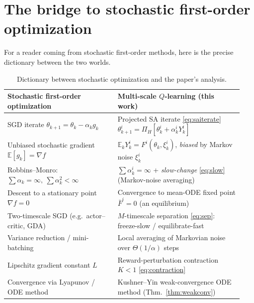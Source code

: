 \documentclass[11pt]{article}
\theoremstyle{plain}
\theoremstyle{definition}
\newcommand{\E}{\mathbb{E}}
\begin{document}
\section{The bridge to stochastic first-order optimization}
\label{sec:bridge}

For a reader coming from stochastic first-order methods, here is the precise
dictionary between the two worlds.

\begin{table}[h]
\centering
\renewcommand{\arraystretch}{1.25}
\begin{tabular}{@{}p{0.44\linewidth} p{0.5\linewidth}@{}}
\toprule
\textbf{Stochastic first-order optimization} & \textbf{Multi-scale $Q$-learning (this work)} \\
\midrule
SGD iterate $\theta_{k+1}=\theta_k-\alpha_k g_k$ &
  Projected SA iterate \eqref{eq:saiterate}
  $\theta^i_{k+1}=\Pi_H[\theta^i_k+\alpha^i_k Y^i_k]$ \\
Unbiased stochastic gradient $\E[g_k]=\nabla f$ &
  $\E_k Y^i_k=F^i(\theta_k,\xi^i_k)$, \emph{biased} by Markov noise $\xi^i_k$ \\
Robbins--Monro: $\sum\alpha_k=\infty,\ \sum\alpha_k^2<\infty$ &
  $\sum\alpha^i_k=\infty$ + \emph{slow-change} \eqref{eq:slow}
  (Markov-noise averaging) \\
Descent to a stationary point $\nabla f=0$ &
  Convergence to mean-ODE fixed point $\bar F^i=0$ (an equilibrium) \\
Two-timescale SGD (e.g.\ actor--critic, GDA) &
  $M$-timescale separation \eqref{eq:sep}: freeze-slow / equilibrate-fast \\
Variance reduction / mini-batching &
  Local averaging of Markovian noise over $\Theta(1/\alpha)$ steps \\
Lipschitz gradient constant $L$ &
  Reward-perturbation contraction $K<1$ \eqref{eq:contraction} \\
Convergence via Lyapunov / ODE method &
  Kushner--Yin weak-convergence ODE method (Thm.~\ref{thm:weakconv}) \\
\bottomrule
\end{tabular}
\caption{Dictionary between stochastic optimization and the paper's analysis.}
\label{tab:bridge}
\end{table}
\end{document}
